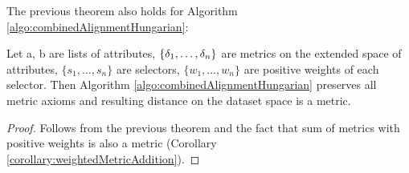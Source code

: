 The previous theorem also holds for Algorithm \ref{algo:combinedAlignmentHungarian}:
\begin{corollary}
		\label{corollary:metricPreservation}
		Let a, b are lists of attributes, $\{\delta_1, \dots, \delta_n \}$ are metrics on the extended space of attributes, $\{s_1, \dots, s_n\}$ are selectors, $\{w_1, \dots, w_n\}$ are positive weights of each selector. Then Algorithm \ref{algo:combinedAlignmentHungarian} preserves all metric axioms and resulting distance on the dataset space is a metric.	
	\begin{proof}
		Follows from the previous theorem and the fact that sum of metrics with positive weights is also a metric (Corollary \ref{corollary:weightedMetricAddition}).
	\end{proof}
\end{corollary}

